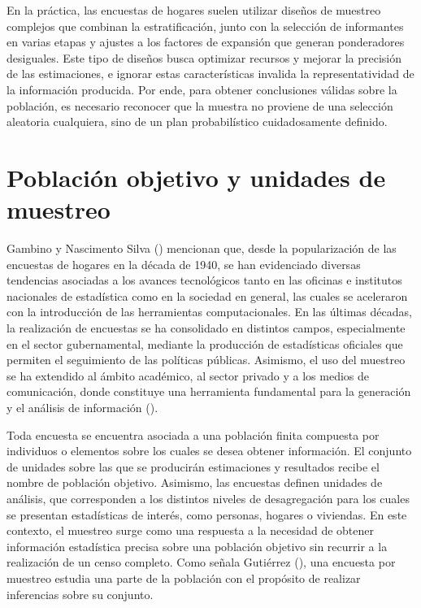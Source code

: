 \documentclass[
  spanish,
  11pt,
  letterpaper,
  oneside,
  open=any]{scrbook}
\begin{document}
En la práctica, las encuestas de hogares suelen utilizar diseños de
muestreo complejos que combinan la estratificación, junto con la
selección de informantes en varias etapas y ajustes a los factores de
expansión que generan ponderadores desiguales. Este tipo de diseños
busca optimizar recursos y mejorar la precisión de las estimaciones, e
ignorar estas características invalida la representatividad de la
información producida. Por ende, para obtener conclusiones válidas sobre
la población, es necesario reconocer que la muestra no proviene de una
selección aleatoria cualquiera, sino de un plan probabilístico
cuidadosamente definido.

\section{Población objetivo y unidades de
muestreo}\label{poblacion-objetivo-y-unidades-de-muestreo}

Gambino y Nascimento Silva ()
mencionan que, desde la popularización de las encuestas de hogares en la
década de 1940, se han evidenciado diversas tendencias asociadas a los
avances tecnológicos tanto en las oficinas e institutos nacionales de
estadística como en la sociedad en general, las cuales se aceleraron con
la introducción de las herramientas computacionales. En las últimas
décadas, la realización de encuestas se ha consolidado en distintos
campos, especialmente en el sector gubernamental, mediante la producción
de estadísticas oficiales que permiten el seguimiento de las políticas
públicas. Asimismo, el uso del muestreo se ha extendido al ámbito
académico, al sector privado y a los medios de comunicación, donde
constituye una herramienta fundamental para la generación y el análisis
de información ().

Toda encuesta se encuentra asociada a una población finita compuesta por
individuos o elementos sobre los cuales se desea obtener información. El
conjunto de unidades sobre las que se producirán estimaciones y
resultados recibe el nombre de población objetivo. Asimismo, las
encuestas definen unidades de análisis, que corresponden a los distintos
niveles de desagregación para los cuales se presentan estadísticas de
interés, como personas, hogares o viviendas. En este contexto, el
muestreo surge como una respuesta a la necesidad de obtener información
estadística precisa sobre una población objetivo sin recurrir a la
realización de un censo completo. Como señala Gutiérrez
(), una encuesta por muestreo estudia
una parte de la población con el propósito de realizar inferencias sobre
su conjunto.
\end{document}
